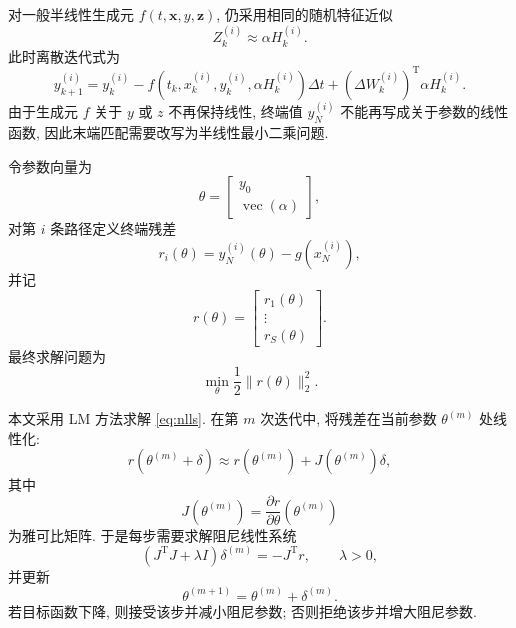     对一般半线性生成元 $f(t, \boldsymbol{x}, y, \boldsymbol{z})$,
    仍采用相同的随机特征近似
    \begin{equation}
      Z_{k}^{(i)} \approx \alpha H_k^{(i)}.
      \label{eq:rff@sl}
    \end{equation}
    此时离散迭代式为
    \begin{equation}
      y_{k + 1}^{(i)} = y_{k}^{(i)}
      - f\!(t_{k}, x_{k}^{(i)}, y_{k}^{(i)}, \alpha H_{k}^{(i)}) \Delta t
      + (\Delta W_{k}^{(i)})^{\operatorname{T}} \alpha H_{k}^{(i)}.
      \label{eq:nldbsde}
    \end{equation}
    由于生成元 $f$ 关于 $y$ 或 $z$ 不再保持线性, 终端值 $y_N^{(i)}$ 不能再写成关于参数的线性函数,
    因此末端匹配需要改写为半线性最小二乘问题.

    令参数向量为
    \begin{equation}
      \theta =
      \begin{bmatrix}
        y_{0} \\
        \operatorname{vec}(\alpha)
      \end{bmatrix},
      \label{eq:theta}
    \end{equation}
    对第 $i$ 条路径定义终端残差
    \begin{equation}
      r_{i}(\theta) = y_{N}^{(i)}(\theta) - g(x_{N}^{(i)}),
      \label{eq:residual4i}
    \end{equation}
    并记
    \begin{equation}
      r(\theta) =
      \begin{bmatrix}
        r_{1}(\theta) \\
        \vdots \\
        r_{S}(\theta)
      \end{bmatrix}.
      \label{eq:residual}
    \end{equation}
    最终求解问题为
    \begin{equation}
      \min_{\theta}
      \frac{1}{2} \lVert r(\theta)\rVert_{2}^{2}.
      \label{eq:nlls}
    \end{equation}

    本文采用 LM 方法求解 \eqref{eq:nlls}.
    在第 $m$ 次迭代中, 将残差在当前参数 $\theta^{(m)}$ 处线性化:
    \begin{equation}
      r(\theta^{(m)}+\delta) \approx r(\theta^{(m)}) + J(\theta^{(m)})\delta,
      \label{eq:reslin}
    \end{equation}
    其中
    \begin{equation}
      J(\theta^{(m)}) = \frac{\partial r}{\partial \theta}(\theta^{(m)})
      \label{eq:jacobian}
    \end{equation}
    为雅可比矩阵.
    于是每步需要求解阻尼线性系统
    \begin{equation}
      (J^{\operatorname{T}}J + \lambda I)\delta^{(m)} = - J^{\operatorname{T}}r, \qquad \lambda > 0,
      \label{eq:lm}
    \end{equation}
    并更新
    \begin{equation}
      \theta^{(m + 1)} = \theta^{(m)} + \delta^{(m)}.
      \label{eq:theta+}
    \end{equation}
    若目标函数下降, 则接受该步并减小阻尼参数; 否则拒绝该步并增大阻尼参数.

